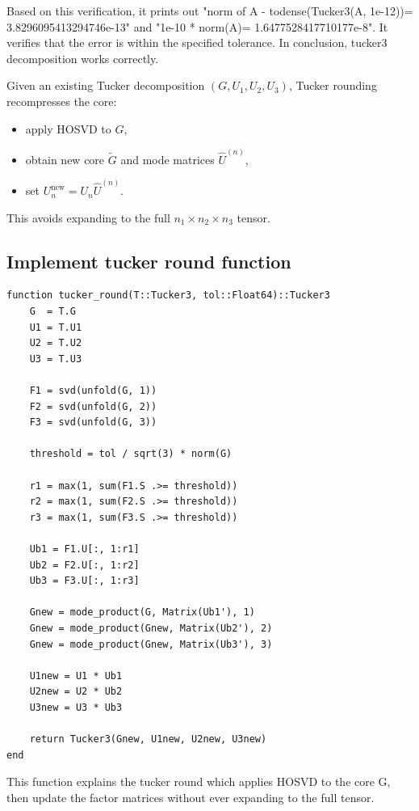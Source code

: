 \documentclass[11pt]{report}
\begin{document}
Based on this verification, it prints out "norm of A - todense(Tucker3(A, 1e-12))= 3.8296095413294746e-13" and "1e-10 * norm(A)= 1.6477528417710177e-8". It verifies that the error is within the specified tolerance. In conclusion, tucker3 decomposition works correctly.



Given an existing Tucker decomposition \((G,U_1,U_2,U_3)\), Tucker rounding recompresses the core:
\begin{itemize}[leftmargin=*]
    \item apply HOSVD to \(G\),
    \item obtain new core \(\widetilde{G}\) and mode matrices \(\widehat{U}^{(n)}\),
    \item set \(U_n^{\text{new}} = U_n \widehat{U}^{(n)}\).
\end{itemize}
This avoids expanding to the full \(n_1 \times n_2 \times n_3\) tensor.

\subsection{Implement tucker round function}

\begin{lstlisting}
function tucker_round(T::Tucker3, tol::Float64)::Tucker3
    G  = T.G
    U1 = T.U1
    U2 = T.U2
    U3 = T.U3

    F1 = svd(unfold(G, 1))
    F2 = svd(unfold(G, 2))
    F3 = svd(unfold(G, 3))

    threshold = tol / sqrt(3) * norm(G)

    r1 = max(1, sum(F1.S .>= threshold))
    r2 = max(1, sum(F2.S .>= threshold))
    r3 = max(1, sum(F3.S .>= threshold))

    Ub1 = F1.U[:, 1:r1]
    Ub2 = F2.U[:, 1:r2]
    Ub3 = F3.U[:, 1:r3]

    Gnew = mode_product(G, Matrix(Ub1'), 1)
    Gnew = mode_product(Gnew, Matrix(Ub2'), 2)
    Gnew = mode_product(Gnew, Matrix(Ub3'), 3)

    U1new = U1 * Ub1
    U2new = U2 * Ub2
    U3new = U3 * Ub3

    return Tucker3(Gnew, U1new, U2new, U3new)
end

\end{lstlisting}

This function explains the tucker round which applies HOSVD to the core G, then update the factor matrices without ever expanding to the full tensor.

\vspace{1.5em}
\end{document}
